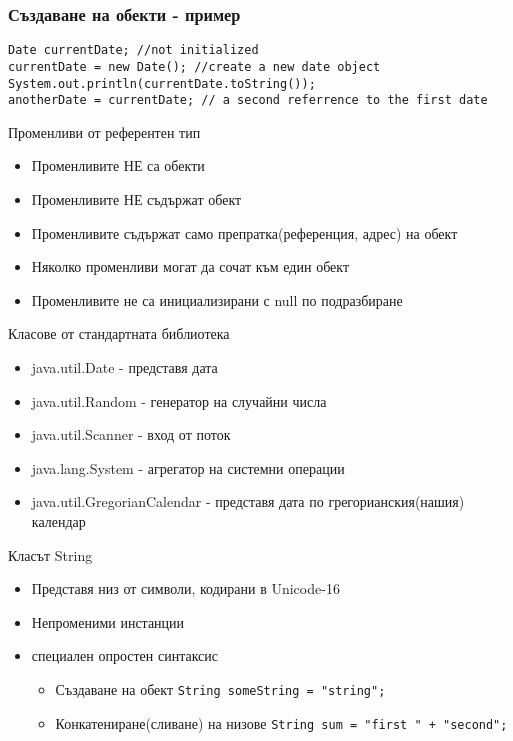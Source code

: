 \documentclass{beamer}
\begin{document}
\begin{frame}[fragile]
  \frametitle{Създаване на обекти - пример}
  \transdissolve
\begin{lstlisting}
Date currentDate; //not initialized
currentDate = new Date(); //create a new date object
System.out.println(currentDate.toString());
anotherDate = currentDate; // a second referrence to the first date
\end{lstlisting}
\end{frame}

\begin{frame}{Променливи от референтен тип}
  \transdissolve
  \begin{itemize}
  \item   Променливите НЕ са обекти
  \item  Променливите НЕ съдържат обект
  \item  Променливите съдържат само
    препратка(референция, адрес) на обект
  \item  Няколко променливи могат да сочат към
    един обект
  \item  Променливите не са инициализирани с
    null по подразбиране
  \end{itemize}
\end{frame}

\begin{frame}{Класове от стандартната библиотека}
  \transdissolve
  \begin{itemize}
  \item java.util.Date -  представя дата
  \item java.util.Random - генератор на случайни числа
  \item java.util.Scanner - вход от поток
  \item java.lang.System - агрегатор на системни
    операции
  \item java.util.GregorianCalendar -  представя дата по
    грегорианския(нашия) календар

  \end{itemize}
\end{frame}

\begin{frame}{Класът String}
  \transdissolve
  \begin{itemize}
  \item Представя низ от символи, кодирани в
    Unicode-16
    \item Непроменими инстанции
    \item специален опростен синтаксис
    \begin{itemize}
    \item Създаване на обект
    \lstinline$String someString = "string";$
    \item Конкатениране(сливане) на низове    
    \lstinline$String sum = "first " + "second";$
    \end{itemize}

  \end{itemize}
\end{frame}
\end{document}
